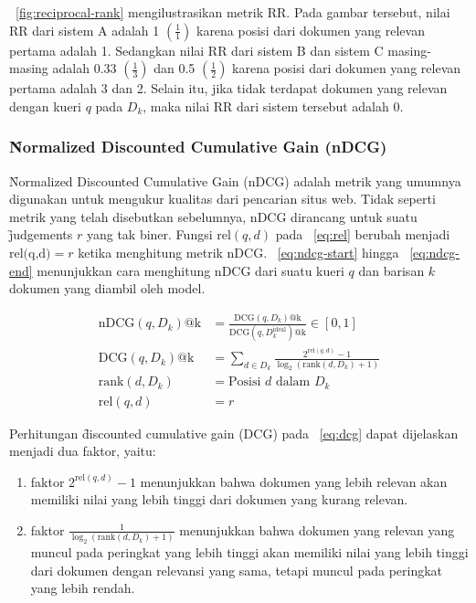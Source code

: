         \pic~\ref{fig:reciprocal-rank} mengilustrasikan metrik RR. Pada gambar tersebut, nilai RR dari sistem A adalah 1 $(\frac{1}{1})$ karena posisi dari dokumen yang relevan pertama adalah 1. Sedangkan nilai RR dari sistem B dan sistem C masing-masing adalah  0.33 $(\frac{1}{3})$ dan 0.5 $(\frac{1}{2})$ karena posisi dari dokumen yang relevan pertama adalah 3 dan 2. Selain itu, jika tidak terdapat dokumen yang relevan dengan kueri $q$ pada $D_k$, maka nilai RR dari sistem tersebut adalah 0. 

        \subsubsection{\f{Normalized Discounted Cumulative Gain} (nDCG)}
        \f{Normalized Discounted Cumulative Gain} (nDCG) adalah metrik yang umumnya digunakan untuk mengukur kualitas dari pencarian situs web. Tidak seperti metrik yang telah disebutkan sebelumnya, nDCG dirancang untuk suatu \f{judgements} $r$ yang tak biner. Fungsi $\text{rel}(q, d)$ pada \equ~\ref{eq:rel} berubah menjadi $\text{rel(q,d)}  = r $ ketika menghitung metrik nDCG. \equ~\ref{eq:ndcg-start} hingga \equ~\ref{eq:ndcg-end} menunjukkan cara menghitung nDCG dari suatu kueri $q$ dan barisan $k$ dokumen yang diambil oleh model.

        \begin{align}
            \label{eq:ndcg-start}
            \text{nDCG}(q, D_k)\text{@k} &= \frac{\text{DCG}(q, D_k)\text{@k}}{\text{DCG}(q, D_k^{\text{ideal}})\text{@k}} \in [0, 1] \\
            \label{eq:dcg}
            \text{DCG}(q, D_k)\text{@k} &= \sum_{d \in D_k} \frac{2^{\text{rel}(q, d)} - 1}{\log_2(\text{rank}(d, D_k) + 1)} \\
            \label{eq:ndcg-end}
            \text{rank}(d,D_k) &= \text{Posisi } d \text{ dalam } D_k \\
            \text{rel}(q, d) &= r
        \end{align}

        Perhitungan \f{discounted cumulative gain} (DCG) pada \equ~\ref{eq:dcg} dapat dijelaskan menjadi dua faktor, yaitu:
        \begin{enumerate}
            \item faktor $2^{\text{rel}(q, d)} - 1$ menunjukkan bahwa dokumen yang lebih relevan akan memiliki nilai yang lebih tinggi dari dokumen yang kurang relevan.
            \item faktor $\frac{1}{\log_2(\text{rank}(d, D_k) + 1)}$ menunjukkan bahwa dokumen yang relevan yang muncul pada peringkat yang lebih tinggi akan memiliki nilai yang lebih tinggi dari dokumen dengan relevansi yang sama, tetapi muncul pada peringkat yang lebih rendah.
        \end{enumerate}

